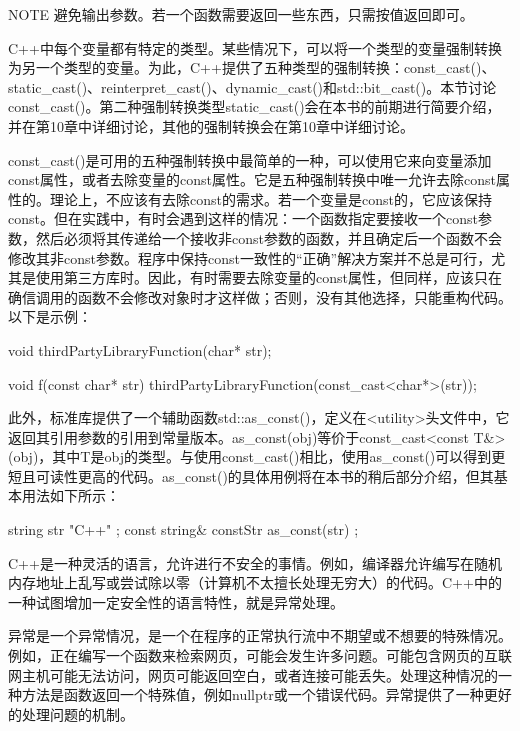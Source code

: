 \begin{myNotic}{NOTE}
避免输出参数。若一个函数需要返回一些东西，只需按值返回即可。
\end{myNotic}


C++中每个变量都有特定的类型。某些情况下，可以将一个类型的变量强制转换为另一个类型的变量。为此，C++提供了五种类型的强制转换：const\_cast()、static\_cast()、reinterpret\_cast()、dynamic\_cast()和std::bit\_cast()。本节讨论const\_cast()。第二种强制转换类型static\_cast()会在本书的前期进行简要介绍，并在第10章中详细讨论，其他的强制转换会在第10章中详细讨论。

const\_cast()是可用的五种强制转换中最简单的一种，可以使用它来向变量添加const属性，或者去除变量的const属性。它是五种强制转换中唯一允许去除const属性的。理论上，不应该有去除const的需求。若一个变量是const的，它应该保持const。但在实践中，有时会遇到这样的情况：一个函数指定要接收一个const参数，然后必须将其传递给一个接收非const参数的函数，并且确定后一个函数不会修改其非const参数。程序中保持const一致性的“正确”解决方案并不总是可行，尤其是使用第三方库时。因此，有时需要去除变量的const属性，但同样，应该只在确信调用的函数不会修改对象时才这样做；否则，没有其他选择，只能重构代码。以下是示例：

\begin{cpp}
void thirdPartyLibraryFunction(char* str);

void f(const char* str)
{
    thirdPartyLibraryFunction(const_cast<char*>(str));
}
\end{cpp}

此外，标准库提供了一个辅助函数std::as\_const()，定义在<utility>头文件中，它返回其引用参数的引用到常量版本。as\_const(obj)等价于const\_cast<const T\&>(obj)，其中T是obj的类型。与使用const\_cast()相比，使用as\_const()可以得到更短且可读性更高的代码。as\_const()的具体用例将在本书的稍后部分介绍，但其基本用法如下所示：

\begin{cpp}
string str { "C++" };
const string& constStr { as_const(str) };
\end{cpp}


C++是一种灵活的语言，允许进行不安全的事情。例如，编译器允许编写在随机内存地址上乱写或尝试除以零（计算机不太擅长处理无穷大）的代码。C++中的一种试图增加一定安全性的语言特性，就是异常处理。

异常是一个异常情况，是一个在程序的正常执行流中不期望或不想要的特殊情况。例如，正在编写一个函数来检索网页，可能会发生许多问题。可能包含网页的互联网主机可能无法访问，网页可能返回空白，或者连接可能丢失。处理这种情况的一种方法是函数返回一个特殊值，例如nullptr或一个错误代码。异常提供了一种更好的处理问题的机制。

